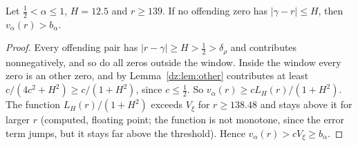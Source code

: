 \begin{theorem}\label{dz:thm:comp}
Let $\frac12<\alpha\le1$, $H=12.5$ and $r\ge139$. If no offending zero has $|\gamma-r|\le H$, then $v_\alpha(r)>b_\alpha$.
\end{theorem}
\begin{proof}
Every offending pair has $|r-\gamma|\ge H>\frac12>\delta_\rho$ and contributes nonnegatively, and so do all zeros outside the window. Inside the window every zero is an other zero, and by Lemma~\ref{dz:lem:other} contributes at least $c/(4c^2+H^2)\ge c/(1+H^2)$, since $c\le\frac12$. So $v_\alpha(r)\ge cL_H(r)/(1+H^2)$. The function $L_H(r)/(1+H^2)$ exceeds $V_\xi$ for $r\ge138.48$ and stays above it for larger $r$ (computed, floating point; the function is not monotone, since the error term jumps, but it stays far above the threshold). Hence $v_\alpha(r)>cV_\xi\ge b_\alpha$.
\end{proof}

